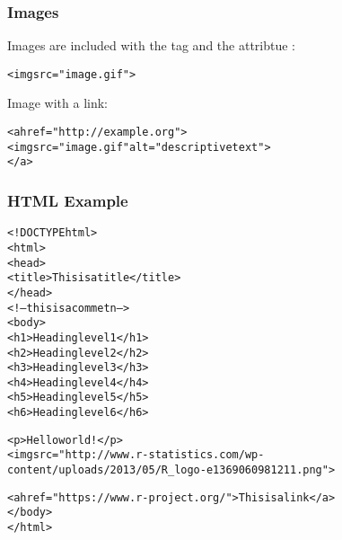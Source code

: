 \documentclass[12pt]{beamer}\usepackage[]{graphicx}\usepackage[]{color}
\makeatletter
\newcommand{\hlstr}[1]{\textcolor[rgb]{0.192,0.494,0.8}{#1}}%
\newenvironment{kframe}{%
 \def\at@end@of@kframe{}%
 \ifinner\ifhmode%
  \def\at@end@of@kframe{\end{minipage}}%
  \begin{minipage}{\columnwidth}%
 \fi\fi%
 \def\FrameCommand##1{\hskip\@totalleftmargin \hskip-\fboxsep
 \colorbox{shadecolor}{##1}\hskip-\fboxsep
     \hskip-\linewidth \hskip-\@totalleftmargin \hskip\columnwidth}%
 \MakeFramed {\advance\hsize-\width
   \@totalleftmargin\z@ \linewidth\hsize
   \@setminipage}}%
 {\par\unskip\endMakeFramed%
 \at@end@of@kframe}
\newenvironment{knitrout}{}{} %
\makeatother
\begin{document}

\begin{frame}[fragile]
\frametitle{Images}

Images are included with the {\hilit {}} tag and the attribtue {\hilit {}}:
\begin{knitrout}\footnotesize
{}\color{fgcolor}\begin{kframe}
\begin{alltt}
<img src=\hlstr{"image.gif"}>
\end{alltt}
\end{kframe}
\end{knitrout}

\bigskip
Image with a link:
\begin{knitrout}\footnotesize
{}\color{fgcolor}\begin{kframe}
\begin{alltt}
<a href=\hlstr{"http://example.org"}>
  <img src=\hlstr{"image.gif"} alt=\hlstr{"descriptive text"}>
</a>
\end{alltt}
\end{kframe}
\end{knitrout}

\end{frame}


\begin{frame}[fragile]
\frametitle{HTML Example}

\begin{knitrout}\scriptsize
{}\color{fgcolor}\begin{kframe}
\begin{alltt}
<!DOCTYPE html>
<html>
  <head>
    <title>This is a title</title>
  </head>
  <!-- this is a commetn -->
  <body>
    <h1>Heading level 1</h1>
    <h2>Heading level 2</h2>
    <h3>Heading level 3</h3>
    <h4>Heading level 4</h4>
    <h5>Heading level 5</h5>
    <h6>Heading level 6</h6>  

    <p>Hello world!</p>
    <img src=\hlstr{"http://www.r-statistics.com/wp-content/uploads/2013/05/R_logo-e1369060981211.png"}>
  
    <a href=\hlstr{"https://www.r-project.org/"}>This is a link</a>
  </body>
</html>
\end{alltt}
\end{kframe}
\end{knitrout}

\end{frame}
\end{document}
